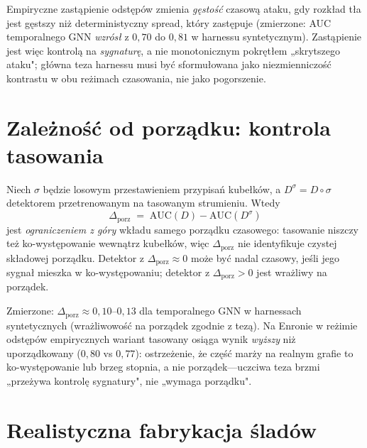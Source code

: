 \begin{remark}
Empiryczne zastąpienie odstępów zmienia \emph{gęstość} czasową ataku,
gdy rozkład tła jest gęstszy niż deterministyczny spread, który
zastępuje (zmierzone: AUC temporalnego GNN \emph{wzrósł} z $0{,}70$ do
$0{,}81$ w harnessu syntetycznym). Zastąpienie jest więc kontrolą na
\emph{sygnaturę}, a nie monotonicznym pokrętłem „skrytszego ataku";
główna teza harnessu musi być sformułowana jako niezmienniczość
kontrastu w obu reżimach czasowania, nie jako pogorszenie.
\end{remark}

\chapter{Zależność od porządku: kontrola tasowania}
\label{sec:shuffle}

\begin{proposition}
\label{prop:shuffle}
Niech $\sigma$ będzie losowym przestawieniem przypisań kubełków, a
$D^\sigma = D\circ\sigma$ detektorem przetrenowanym na tasowanym
strumieniu. Wtedy
\[
\Delta_{\mathrm{porz}} \;=\; \mathrm{AUC}(D) - \mathrm{AUC}(D^\sigma)
\]
jest \emph{ograniczeniem z góry} wkładu samego porządku czasowego:
tasowanie niszczy też ko-występowanie wewnątrz kubełków, więc
$\Delta_{\mathrm{porz}}$ nie identyfikuje czystej składowej porządku.
Detektor z $\Delta_{\mathrm{porz}}\approx0$ może być nadal czasowy, jeśli
jego sygnał mieszka w ko-występowaniu; detektor z
$\Delta_{\mathrm{porz}}>0$ jest wrażliwy na porządek.
\end{proposition}

\begin{remark}
Zmierzone: $\Delta_{\mathrm{porz}}\approx0{,}10$--$0{,}13$ dla
temporalnego GNN w harnessach syntetycznych (wrażliwowość na porządek
zgodnie z tezą). Na Enronie w reżimie odstępów empirycznych wariant
tasowany osiąga wynik \emph{wyższy} niż uporządkowany ($0{,}80$ vs
$0{,}77$): ostrzeżenie, że część marży na realnym grafie to
ko-występowanie lub brzeg stopnia, a nie porządek---uczciwa teza brzmi
„przeżywa kontrolę sygnatury", nie „wymaga porządku".
\end{remark}

\chapter{Realistyczna fabrykacja śladów}
\label{sec:fabrication}

